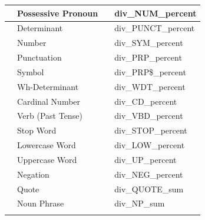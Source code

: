 \documentclass{article}
\begin{document}
\begin{appendices}
\begin{longtable}[c]{| >{\centering\arraybackslash}p{} | >{\centering\arraybackslash}p{} | >{\centering\arraybackslash}p{} | >{\centering\arraybackslash}p{} |}
                                   & Possessive Pronoun                   &                           & div\_NUM\_percent           \\ \cline{2-2} \cline{4-4} 
                                   & Determinant                          &                           & div\_PUNCT\_percent         \\ \cline{2-2} \cline{4-4} 
                                   & Number                               &                           & div\_SYM\_percent           \\ \cline{2-2} \cline{4-4} 
                                   & Punctuation                          &                           & div\_PRP\_percent           \\ \cline{2-2} \cline{4-4} 
                                   & Symbol                               &                           & div\_PRP\$\_percent         \\ \cline{2-2} \cline{4-4} 
                                   & Wh-Determinant                       &                           & div\_WDT\_percent           \\ \cline{2-2} \cline{4-4} 
                                   & Cardinal Number                      &                           & div\_CD\_percent            \\ \cline{2-2} \cline{4-4} 
                                   & Verb (Past Tense)                    &                           & div\_VBD\_percent           \\ \cline{2-2} \cline{4-4} 
                                   & Stop Word                            &                           & div\_STOP\_percent          \\ \cline{2-2} \cline{4-4} 
                                   & Lowercase Word                       &                           & div\_LOW\_percent           \\ \cline{2-2} \cline{4-4} 
                                   & Uppercase Word                       &                           & div\_UP\_percent            \\ \cline{2-2} \cline{4-4} 
                                   & Negation                             &                           & div\_NEG\_percent           \\ \cline{2-4} 
                                   & Quote                                & \multirow{6}{*}{Count}    & div\_QUOTE\_sum             \\ \cline{2-2} \cline{4-4} 
                                   & Noun Phrase                          &                           & div\_NP\_sum                \\ \cline{2-2} \cline{4-4} 

\end{longtable}
\end{appendices}
\end{document}
